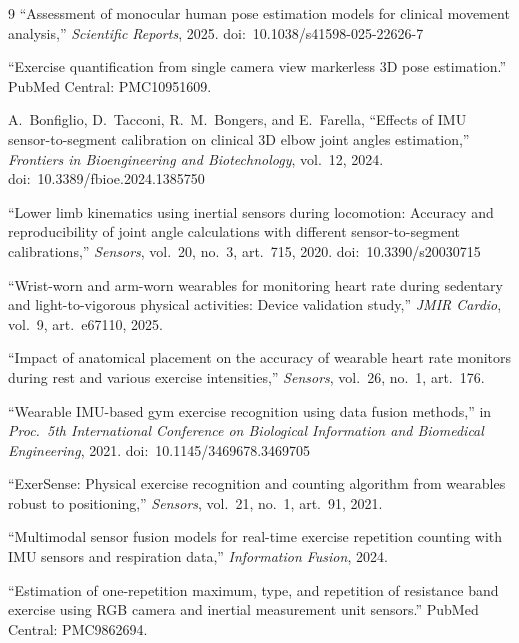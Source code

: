 \documentclass[11pt,a4paper]{article}
\begin{document}
\begin{thebibliography}{9}
``Assessment of monocular human pose estimation models for clinical movement
analysis,'' \emph{Scientific Reports}, 2025.
doi:\ 10.1038/s41598-025-22626-7

``Exercise quantification from single camera view markerless 3D pose
estimation.'' PubMed Central: PMC10951609.

A.\ Bonfiglio, D.\ Tacconi, R.\ M.\ Bongers, and E.\ Farella, ``Effects of IMU
sensor-to-segment calibration on clinical 3D elbow joint angles estimation,''
\emph{Frontiers in Bioengineering and Biotechnology}, vol.\ 12, 2024.
doi:\ 10.3389/fbioe.2024.1385750

``Lower limb kinematics using inertial sensors during locomotion: Accuracy and
reproducibility of joint angle calculations with different sensor-to-segment
calibrations,'' \emph{Sensors}, vol.\ 20, no.\ 3, art.\ 715, 2020.
doi:\ 10.3390/s20030715

``Wrist-worn and arm-worn wearables for monitoring heart rate during sedentary
and light-to-vigorous physical activities: Device validation study,''
\emph{JMIR Cardio}, vol.\ 9, art.\ e67110, 2025.

``Impact of anatomical placement on the accuracy of wearable heart rate monitors
during rest and various exercise intensities,'' \emph{Sensors}, vol.\ 26,
no.\ 1, art.\ 176.

``Wearable IMU-based gym exercise recognition using data fusion methods,'' in
\emph{Proc.\ 5th International Conference on Biological Information and
Biomedical Engineering}, 2021. doi:\ 10.1145/3469678.3469705

``ExerSense: Physical exercise recognition and counting algorithm from wearables
robust to positioning,'' \emph{Sensors}, vol.\ 21, no.\ 1, art.\ 91, 2021.

``Multimodal sensor fusion models for real-time exercise repetition counting
with IMU sensors and respiration data,'' \emph{Information Fusion}, 2024.

``Estimation of one-repetition maximum, type, and repetition of resistance band
exercise using RGB camera and inertial measurement unit sensors.'' PubMed
Central: PMC9862694.

\end{thebibliography}

\appendix
\end{document}
